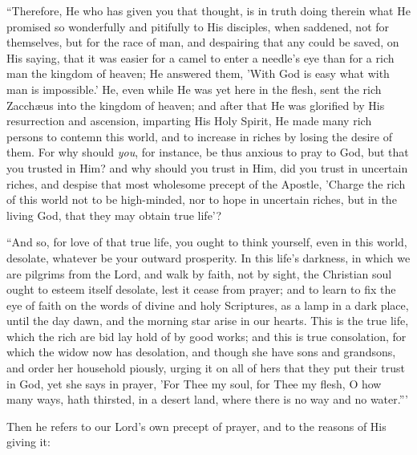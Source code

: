 ``Therefore, He who has given you that thought, is in truth
doing therein what He promised so wonderfully and pitifully to His
disciples, when saddened, not for themselves, but for the race of man,
and despairing that any could be saved, on His saying, that it was
easier for a camel to enter a needle's eye than for a rich man the
kingdom of heaven; He answered them, 'With God is easy what with man
is impossible.' He, even while He was yet here in the flesh, sent the
rich Zacchæus into the kingdom of heaven; and after that He was
glorified by His resurrection and ascension, imparting His Holy
Spirit, He made many rich persons to contemn this world, and to
increase in riches by losing the desire of them. For why should \emph{you},
for instance, be thus anxious to pray to God, but that you trusted in
Him? and why should you trust in Him, did you trust in uncertain
riches, and despise that most wholesome precept of the Apostle,
'Charge the rich of this world not to be high-minded, nor to hope in
uncertain riches, but in the living God, that they may obtain true
life'?

``And so, for love of that true life, you ought to think
yourself, even in this world, desolate, whatever be your outward
prosperity. In this life's darkness, in which we are pilgrims from the
Lord, and walk by faith, not by sight, the Christian soul ought to
esteem itself desolate, lest it cease from prayer; and to learn to fix
the eye of faith on the words of divine and holy Scriptures, as a lamp
in a dark place, until the day dawn, and the morning star arise in our
hearts. This is the true life, which the rich are bid lay hold of by
good works; and this is true consolation, for which the widow now has
desolation, and though she have sons and grandsons, and order her
household piously, urging it on all of hers that they put their trust
in God, yet she says in prayer, 'For Thee my soul, for Thee my flesh,
O how many ways, hath thirsted, in a desert land, where there is no
way and no water.'''

Then he refers to our Lord's own precept of prayer, and to the
reasons of His giving it:

